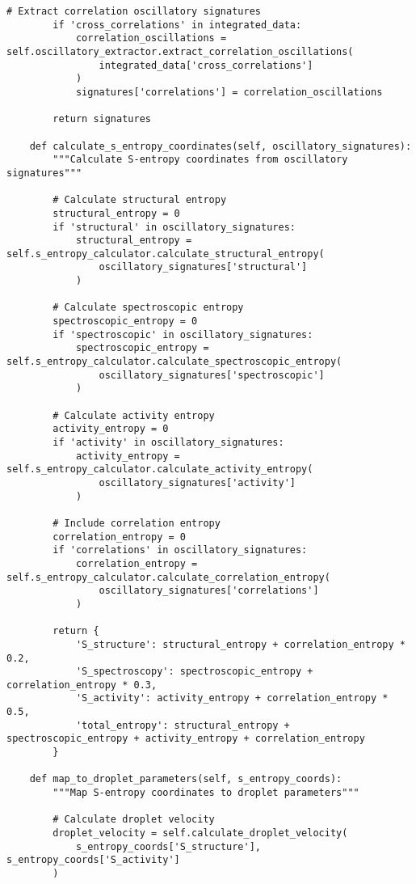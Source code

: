 \documentclass[12pt,a4paper]{article}
\begin{document}
\begin{lstlisting}[style=pythonstyle, caption=Core Molecular-to-Computer Vision Transformation Implementation]
        # Extract correlation oscillatory signatures
        if 'cross_correlations' in integrated_data:
            correlation_oscillations = self.oscillatory_extractor.extract_correlation_oscillations(
                integrated_data['cross_correlations']
            )
            signatures['correlations'] = correlation_oscillations

        return signatures

    def calculate_s_entropy_coordinates(self, oscillatory_signatures):
        """Calculate S-entropy coordinates from oscillatory signatures"""

        # Calculate structural entropy
        structural_entropy = 0
        if 'structural' in oscillatory_signatures:
            structural_entropy = self.s_entropy_calculator.calculate_structural_entropy(
                oscillatory_signatures['structural']
            )

        # Calculate spectroscopic entropy
        spectroscopic_entropy = 0
        if 'spectroscopic' in oscillatory_signatures:
            spectroscopic_entropy = self.s_entropy_calculator.calculate_spectroscopic_entropy(
                oscillatory_signatures['spectroscopic']
            )

        # Calculate activity entropy
        activity_entropy = 0
        if 'activity' in oscillatory_signatures:
            activity_entropy = self.s_entropy_calculator.calculate_activity_entropy(
                oscillatory_signatures['activity']
            )

        # Include correlation entropy
        correlation_entropy = 0
        if 'correlations' in oscillatory_signatures:
            correlation_entropy = self.s_entropy_calculator.calculate_correlation_entropy(
                oscillatory_signatures['correlations']
            )

        return {
            'S_structure': structural_entropy + correlation_entropy * 0.2,
            'S_spectroscopy': spectroscopic_entropy + correlation_entropy * 0.3,
            'S_activity': activity_entropy + correlation_entropy * 0.5,
            'total_entropy': structural_entropy + spectroscopic_entropy + activity_entropy + correlation_entropy
        }

    def map_to_droplet_parameters(self, s_entropy_coords):
        """Map S-entropy coordinates to droplet parameters"""

        # Calculate droplet velocity
        droplet_velocity = self.calculate_droplet_velocity(
            s_entropy_coords['S_structure'], s_entropy_coords['S_activity']
        )


\end{lstlisting}
\end{document}
